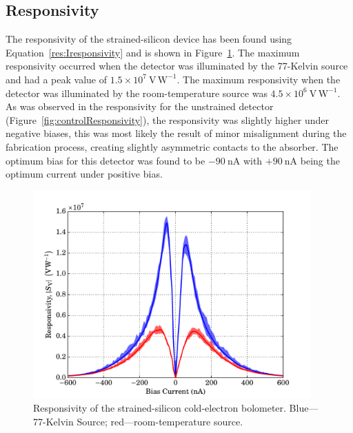 \subsection{Responsivity}\label{ssec:opticalStrainedSi_responsivity}
The responsivity of the strained-silicon device has been found using Equation~\ref{res:Iresponsivity} and is shown in Figure~\ref{fig:strainedResponsivity}. The maximum responsivity occurred when the detector was illuminated by the 77-Kelvin source and had a peak value of $1.5 \times 10^{7}~\mathrm{V\,W^{-1}}$. The maximum responsivity when the detector was illuminated by the room-temperature source was $4.5 \times 10^{6}~\mathrm{V\,W^{-1}}$. As was observed in the responsivity for the unstrained detector (Figure~\ref{fig:controlResponsivity}), the responsivity was slightly higher under negative biases, this was most likely the result of minor misalignment during the fabrication process, creating slightly asymmetric contacts to the absorber. The optimum bias for this detector was found to be $-90~\mathrm{nA}$ with $+90~\mathrm{nA}$ being the optimum current under positive bias.
\begin{figure}[tb]
\begin{center}
\includegraphics[width = 0.95\textwidth]{figures/strained_responsivity}
\caption[Responsivity of the strained-SiCEB device]{Responsivity of the strained-silicon cold-electron bolometer. Blue---77-Kelvin Source; red---room-temperature source.}
\label{fig:strainedResponsivity}
\end{center}
\end{figure}
\par 
